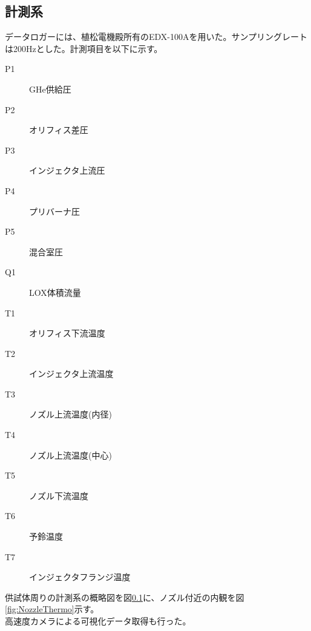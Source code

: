 \subsection{計測系}
データロガーには、植松電機殿所有のEDX-100Aを用いた。サンプリングレートは200Hzとした。計測項目を以下に示す。
\begin{description}
\item[P1]GHe供給圧
\item[P2]オリフィス差圧
\item[P3]インジェクタ上流圧
\item[P4]プリバーナ圧
\item[P5]混合室圧
\item[Q1]LOX体積流量
\item[T1]オリフィス下流温度
\item[T2]インジェクタ上流温度
\item[T3]ノズル上流温度(内径)
\item[T4]ノズル上流温度(中心)
\item[T5]ノズル下流温度
\item[T6]予鈴温度
\item[T7]インジェクタフランジ温度
\end{description}
供試体周りの計測系の概略図を図\ref{}に、ノズル付近の内観を図\ref{fig:NozzleThermo}示す。
\\
高速度カメラによる可視化データ取得も行った。

